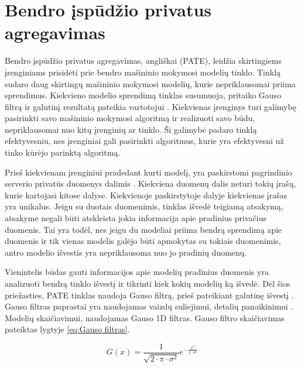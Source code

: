 \documentclass{VUMIFInfBakalaurinis}
\begin{document}
\section{Bendro įspūdžio privatus agregavimas}
\par Bendro įspūdžio privatus agregavimas, angliškai  (PATE), leidžia skirtingiems įrenginiams prisidėti prie bendro mašininio mokymosi modelių tinklo. Tinklą sudaro daug skirtingų mašininio mokymosi modelių, kurie nepriklausomai priima sprendimus. Kiekvieno modelio sprendimą tinklas susumuoja, pritaiko Gauso filtrą ir galutinį rezultatą pateikia vartotojui \cite{27}. Kiekvienas įrenginys turi galimybę pasirinkti savo mašininio mokymosi algoritmą ir realizuoti savo būdu, nepriklausomai nuo kitų įrenginių ar tinklo. Ši galimybė padaro tinklą efektyvesniu, nes įrenginiai gali pasirinkti algoritmus, kurie yra efektyvesni už tinko kūrėjo parinktą algoritmą.
\par Prieš kiekvienam įrenginiui pradedant kurti modelį, yra paskirstomi pagrindinio serverio privatūs duomenys dalimis \cite{27}. Kiekviena duomenų dalis neturi tokių įrašų, kurie kartojasi kitose dalyse. Kiekvienoje paskirstytoje dalyje kiekvienas įrašas yra unikalus. Jeigu su duotais duomenimis, tinklas išvedė teigiamą atsakymą, atsakyme negali būti atskleista jokia informacija apie pradinius privačius duomenis. Tai yra todėl, nes jeigu du modeliai priima bendrą sprendimą apie duomenis ir tik vienas modelis galėjo būti apmokytas su tokiais duomenimis, antro modelio išvestis yra nepriklausoma nuo jo pradinių duomenų. 
\par Vienintelis būdas gauti informacijos apie modelių pradinius duomenis yra analizuoti bendrą tinklo išvestį ir tikrinti kiek kokių modelių ką išvedė. Dėl šios priežasties, PATE tinklas naudoja Gauso filtrą, prieš pateikiant galutinę išvestį \cite{27}. Gauso filtras paprastai yra naudojamas vaizdų suliejimui, detalių panaikinimui \cite{28}. Modelių  skaičiavimui, naudojamas Gauso 1D filtras. Gauso filtro skaičiavimas pateiktas lygtyje \eqref{eq:Gauso filtras}. 

\begin{equation}
    G(x) = \frac{1}{\sqrt{2 \cdot \pi \cdot \sigma^{2}}}e^{-\frac{x^{2}}{2 \cdot \sigma^{2}}}
    \label{eq:Gauso filtras}
\end{equation}
\end{document}
